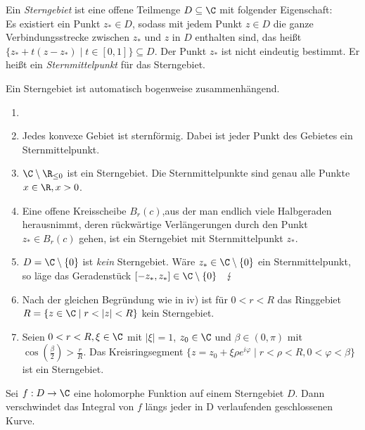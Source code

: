 \lecture
		\begin{defn}[Sterngebiet]
			Ein \emph{Sterngebiet} ist eine offene Teilmenge $ D \subseteq \C $ mit folgender Eigenschaft:\\
			Es existiert ein Punkt $ z_* \in D $, sodass mit jedem Punkt $ z \in D $ die ganze Verbindungsstrecke zwischen $z_*$ und $z$ in $D$ enthalten sind, das heißt $ \{ z_* + t(z-z_*) \mid t \in [0,1] \} \subseteq D $. Der Punkt $z_*$ ist nicht eindeutig bestimmt. Er heißt ein \emph{Sternmittelpunkt} für das Sterngebiet.
		\end{defn}
		
		\begin{rem}
			Ein Sterngebiet ist automatisch bogenweise zusammenhängend.
		\end{rem}
		
		\begin{exmp*}
			\begin{enumerate}[label = {\roman*})]
				\item[]
				\item Jedes konvexe Gebiet ist sternförmig. Dabei ist jeder Punkt des Gebietes ein Sternmittelpunkt.
				\item $ \C \setminus \R_{\leq 0} $ ist ein Sterngebiet. Die Sternmittelpunkte sind genau alle Punkte $ x \in \R, x > 0 $.
				\item Eine offene Kreisscheibe $ B_r(c) $,aus der man endlich viele Halbgeraden herausnimmt, deren rückwärtige Verlängerungen durch den Punkt $z_* \in B_r(c)$ gehen, ist ein Sterngebiet mit Sternmittelpunkt $z_*$.
				\item $ D = \C \setminus \{0\} $ ist \emph{kein} Sterngebiet. Wäre $ z_* \in \C \setminus\{0\} $ ein Sternmittelpunkt, so läge das Geradenstück $ [-z_*,z_*] \in \C \setminus \{0\} \quad \lightning $
				\item Nach der gleichen Begründung wie in iv) ist für $ 0<r<R $ das Ringgebiet $ R = \{ z \in \C \mid r < |z| < R \} $ kein Sterngebiet.
				\item Seien $ 0<r<R, \xi \in \C $ mit $ |\xi|=1 $, $z_0 \in \C$ und $ \beta \in (0,\pi) $ mit $ \cos\left(\frac{\beta}{2}\right) > \frac{r}{R} $. Das Kreisringsegment $ \{ z = z_0 + \xi\rho e^{i\varphi} \mid r<\rho<R, 0<\varphi<\beta \} $ ist ein Sterngebiet.
			\end{enumerate}
		\end{exmp*}
		
		\begin{thmn}
			Sei $ f: D \to \C $ eine holomorphe Funktion auf einem Sterngebiet $D$. Dann verschwindet das Integral von $f$ längs jeder in D verlaufenden geschlossenen Kurve.
		\end{thmn}
		
